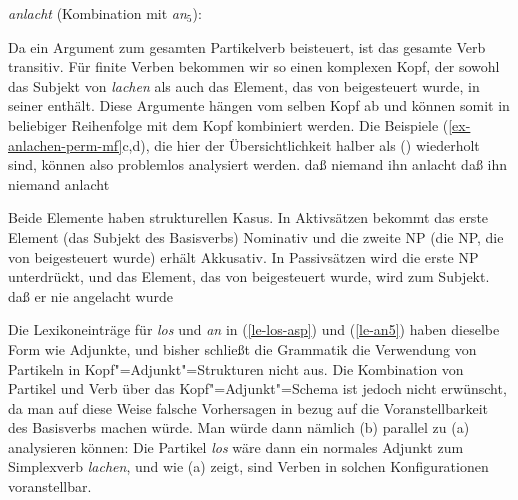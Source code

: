 \eas
\emph{anlacht} (Kombination mit \emph{an$_5$}):\\
\zs

\noindent
Da \anf ein Argument zum gesamten Partikelverb beisteuert, ist das gesamte Verb transitiv.
Für finite Verben bekommen wir so einen komplexen Kopf, der sowohl das Subjekt von \emph{lachen}
als auch das Element, das von \anf beigesteuert wurde, in seiner \subcatl enthält.
Diese Argumente hängen vom selben Kopf ab und können somit in beliebiger Reihenfolge
mit dem Kopf kombiniert werden. Die Beispiele (\ref{ex-anlachen-perm-mf}c,d), die hier
der Übersichtlichkeit halber als () wiederholt sind, können also problemlos analysiert werden.
\eal
\ex
daß    niemand           ihn           anlacht
\ex
daß    ihn           niemand          anlacht
\zl

\noindent
Beide Elemente haben strukturellen Kasus. In Aktivsätzen bekommt das erste Element (das Subjekt des Basisverbs)
Nominativ und die zweite NP (die NP, die von \anf beigesteuert wurde) erhält Akkusativ.
In Passivsätzen wird die erste NP unterdrückt, und das Element, das von \anf beigesteuert wurde,
wird zum Subjekt.
\ea
daß    er       nie   angelacht          wurde
\z

\noindent
Die Lexikoneinträge für \emph{los} und \emph{an} in (\ref{le-los-asp}) und (\ref{le-an5})
haben dieselbe Form wie Adjunkte, und bisher schließt die Grammatik die Verwendung von Partikeln
in Kopf"=Adjunkt"=Strukturen nicht aus. Die Kombination von Partikel und Verb über das
Kopf"=Adjunkt"=Schema ist jedoch nicht erwünscht, da man auf diese Weise falsche Vorhersagen in bezug
auf die Voranstellbarkeit des Basisverbs machen würde. Man würde dann nämlich (b) parallel
zu (a) analysieren können:
\eal
{}
\zl
Die Partikel \emph{los} wäre dann ein normales Adjunkt zum Simplexverb \emph{lachen},
und wie (a) zeigt, sind Verben in solchen Konfigurationen voranstellbar.


